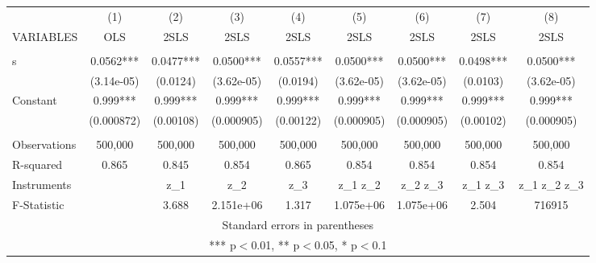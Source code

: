 \begin{tabular}{lcccccccc} \hline
 & (1) & (2) & (3) & (4) & (5) & (6) & (7) & (8) \\
VARIABLES & OLS & 2SLS & 2SLS & 2SLS & 2SLS & 2SLS & 2SLS & 2SLS \\ \hline
 &  &  &  &  &  &  &  &  \\
s & 0.0562*** & 0.0477*** & 0.0500*** & 0.0557*** & 0.0500*** & 0.0500*** & 0.0498*** & 0.0500*** \\
 & (3.14e-05) & (0.0124) & (3.62e-05) & (0.0194) & (3.62e-05) & (3.62e-05) & (0.0103) & (3.62e-05) \\
Constant & 0.999*** & 0.999*** & 0.999*** & 0.999*** & 0.999*** & 0.999*** & 0.999*** & 0.999*** \\
 & (0.000872) & (0.00108) & (0.000905) & (0.00122) & (0.000905) & (0.000905) & (0.00102) & (0.000905) \\
 &  &  &  &  &  &  &  &  \\
Observations & 500,000 & 500,000 & 500,000 & 500,000 & 500,000 & 500,000 & 500,000 & 500,000 \\
R-squared & 0.865 & 0.845 & 0.854 & 0.865 & 0.854 & 0.854 & 0.854 & 0.854 \\
Instruments &  & z\_1 & z\_2 & z\_3 & z\_1 z\_2 & z\_2 z\_3 & z\_1 z\_3 & z\_1 z\_2 z\_3 \\
 F-Statistic &  & 3.688 & 2.151e+06 & 1.317 & 1.075e+06 & 1.075e+06 & 2.504 & 716915 \\ \hline
\multicolumn{9}{c}{ Standard errors in parentheses} \\
\multicolumn{9}{c}{ *** p$<$0.01, ** p$<$0.05, * p$<$0.1} \\
\end{tabular}
